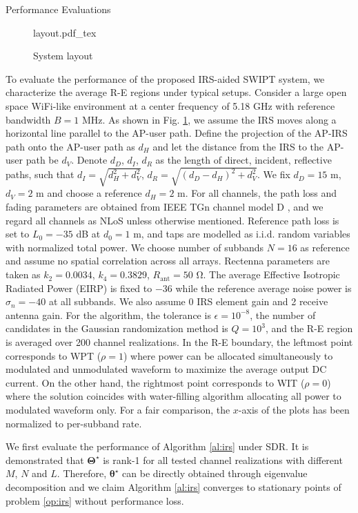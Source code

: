 \documentclass[journal]{IEEEtran}
\begin{document}
	\begin{section}{Performance Evaluations}\label{se:performance_evaluation}
		\begin{figure}[!t]
			\centering
			\def\svgwidth{\columnwidth}
			{layout.pdf_tex}
			\caption{System layout}
			\label{fi:layout}
		\end{figure}
		To evaluate the performance of the proposed IRS-aided SWIPT system, we characterize the average R-E regions under typical setups. Consider a large open space WiFi-like environment at a center frequency of 5.18 \si{\GHz} with reference bandwidth $B=1$ \si{\MHz}. As shown in Fig. \ref{fi:layout}, we assume the IRS moves along a horizontal line parallel to the AP-user path. Define the projection of the AP-IRS path onto the AP-user path as $d_H$ and let the distance from the IRS to the AP-user path be $d_V$. Denote $d_D$, $d_I$, $d_R$ as the length of direct, incident, reflective paths, such that $d_I=\sqrt{d_H^2+d_V^2}$, $d_R=\sqrt{(d_D-d_H)^2+d_V^2}$. We fix $d_D=15$ \si{\meter}, $d_V=2$ \si{\meter} and choose a reference $d_H=2$ \si{\meter}. For all channels, the path loss and fading parameters are obtained from IEEE TGn channel model D \cite{Erceg2004}, and we regard all channels as NLoS unless otherwise mentioned. Reference path loss is set to $L_0=-35$ \si{\dB} at $d_0=1$ \si{\meter}, and taps are modelled as i.i.d. random variables with normalized total power. We choose number of subbands $N=16$ as reference and assume no spatial correlation across all arrays. Rectenna parameters are taken as $k_2=0.0034$, $k_4=0.3829$, $R_{\text{ant}}=50$ \si{\ohm}. The average Effective Isotropic Radiated Power (EIRP) is fixed to $-36$ \si{\dBm} while the reference average noise power is $\sigma_n=-40$ \si{\dBm} at all subbands. We also assume 0 \si{\dBi} IRS element gain and 2 \si{\dBi} receive antenna gain. For the algorithm, the tolerance is $\epsilon=10^{-8}$, the number of candidates in the Gaussian randomization method is $Q=10^{3}$, and the R-E region is averaged over 200 channel realizations. In the R-E boundary, the leftmost point corresponds to WPT ($\rho=1$) where power can be allocated simultaneously to modulated and unmodulated waveform to maximize the average output DC current. On the other hand, the rightmost point corresponds to WIT ($\rho=0$) where the solution coincides with water-filling algorithm allocating all power to modulated waveform only. For a fair comparison, the $x$-axis of the plots has been normalized to per-subband rate.

		We first evaluate the performance of Algorithm \ref{al:irs} under SDR. It is demonstrated that $\boldsymbol{\Theta}^{\star}$ is rank-1 for all tested channel realizations with different $M$, $N$ and $L$. Therefore, $\boldsymbol{\theta}^{\star}$ can be directly obtained through eigenvalue decomposition and we claim Algorithm \ref{al:irs} converges to stationary points of problem \ref{op:irs} without performance loss.


\end{section}
\end{document}
